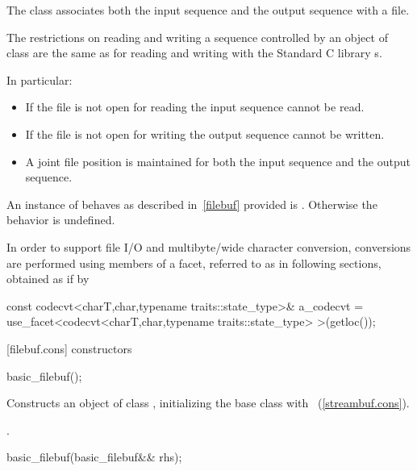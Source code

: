 \pnum
The class
associates both the input sequence and the output
sequence with a file.

\pnum
The restrictions on reading and writing a sequence controlled by an
object of class
are the same as for reading and writing with the Standard C library
s.

\pnum
In particular:
\begin{itemize}
\item
If the file is not open for reading the input sequence
cannot be read.
\item
If the file is not open for writing the output
sequence cannot be written.
\item
A joint file position is maintained for both the input sequence and
the output sequence.
\end{itemize}

\pnum
An instance of
behaves as described in~\ref{filebuf} provided
is
.
Otherwise the behavior is undefined.

\pnum
In order to support file I/O and multibyte/wide character conversion,
conversions are performed using members of a facet, referred to as
 in following sections, obtained as if by

\begin{codeblock}
const codecvt<charT,char,typename traits::state_type>& a_codecvt =
  use_facet<codecvt<charT,char,typename traits::state_type> >(getloc());
\end{codeblock}

[filebuf.cons]{ constructors}

%
\begin{itemdecl}
basic_filebuf();
\end{itemdecl}

\begin{itemdescr}
\pnum
\effects
Constructs an object of class
,
initializing the base class with
~(\ref{streambuf.cons}).

\pnum
\postcondition
{}.
\end{itemdescr}

%
\begin{itemdecl}
basic_filebuf(basic_filebuf&& rhs);
\end{itemdecl}

